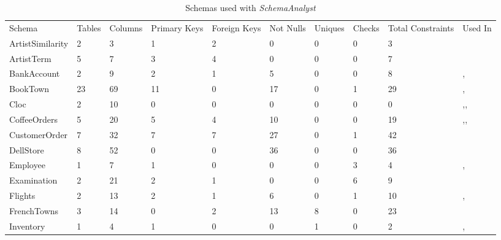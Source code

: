 \begin{table*}[t]
\tiny
\centering
\caption{Schemas used with \textit{SchemaAnalyst}}
\label{tab:schemas}
\begin{tabular}{llllllllll}
Schema & Tables & Columns & Primary Keys & Foreign Keys & Not Nulls & Uniques & Checks & Total Constraints & Used In \\
ArtistSimilarity & 2 & 3  &      1       &      2       &    0      &    0    &    0   & 3 & \cite{wright2014impact} \\
ArtistTerm & 5 & 7        &      3       &       4      &    0      &    0    &    0   & 7 &  \cite{wright2014impact} \\
BankAccount & 2 & 9       &        2     &         1    &       5   &   0     &    0   & 8 & \cite{kapfhammer2013search},\cite{wright2014impact} \\
BookTown   & 23 & 69      &  11          &       0      &    17     &   0     &     1  & 29 & \cite{kapfhammer2013search},\cite{wright2014impact}  \\
Cloc       & 2  & 10      &           0  &      0       &    0      &     0   &   0    & 0  &   \cite{kapfhammer2013search},\cite{wright2013efficient},\cite{wright2014impact}  \\
CoffeeOrders & 5 & 20     &      5       &    4         &    10     &   0     &    0   & 19 & \cite{mcminn2016virtual},\cite{kapfhammer2013search},\cite{wright2014impact}\\
CustomerOrder & 7 & 32    &     7        &    7         &    27     &    0    &     1  & 42 &  \cite{kapfhammer2013search}  \\
DellStore  & 8 & 52       &        0     &   0          &  36       &    0    &    0   & 36 & \cite{kapfhammer2013search}  \\
Employee     & 1 &  7     &          1   & 0            &      0    &    0    &     3  & 4 & \cite{mcminn2016virtual},\cite{kapfhammer2013search} \\
Examination & 2 & 21      &       2      &    1         &    0      &      0  &   6    & 9 & \cite{kapfhammer2013search}   \\
Flights   &   2 & 13      &      2       &     1        &    6      &    0    &    1   & 10 &  \cite{kapfhammer2013search},\cite{wright2014impact}  \\
FrenchTowns  & 3 & 14     &      0       &     2        &    13     &   8     &   0    & 23 & \cite{kapfhammer2013search}   \\
Inventory    & 1 &  4     &    1         &   0          &        0  &    1    &  0     & 2 &  \cite{mcminn2016virtual},\cite{kapfhammer2013search}\\

\end{tabular}
\end{table*}
